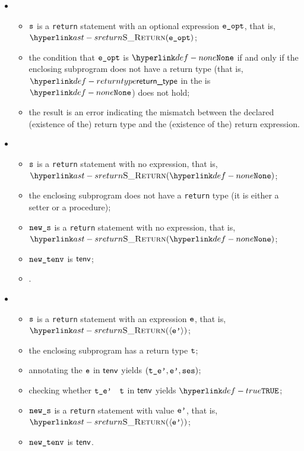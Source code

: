 \ProseParagraph
\OneApplies
\begin{itemize}
  \item {}
  \begin{itemize}
    \item $\vs$ is a \texttt{return} statement with an optional expression $\veopt$, that is, \\
          $\SReturn(\veopt)$;
    \item the condition that $\veopt$ is $\None$ if and only if the enclosing subprogram does not have a return type
          (that is, $\returntype$ in the \localstaticenvironmentterm{} is $\None$) does not hold;
    \item the result is an error indicating the mismatch between the declared (existence of the) return type
          and the (existence of the) return expression.
  \end{itemize}

  \item {}
  \begin{itemize}
    \item $\vs$ is a \texttt{return} statement with no expression, that is, $\SReturn(\None)$;
    \item the enclosing subprogram does not have a \texttt{return} type (it is either a setter
          or a procedure);
    \item $\news$ is a \texttt{return} statement with no expression, that is, $\SReturn(\None)$;
    \item $\newtenv$ is $\tenv$;
    \item {}.
  \end{itemize}

  \item {}
  \begin{itemize}
    \item $\vs$ is a \texttt{return} statement with an expression $\ve$, that is, $\SReturn(\langle \vep \rangle)$;
    \item the enclosing subprogram has a return type $\vt$;
    \item annotating the \rhsexpression{} $\ve$ in $\tenv$ yields $(\tep,\vep,\vses)$\ProseOrTypeError;
    \item checking whether $\vtep$ \typesatisfies\ $\vt$ in $\tenv$ yields $\True$\ProseOrTypeError;
    \item $\news$ is a \texttt{return} statement with value $\vep$, that is, $\SReturn(\langle \vep \rangle)$;
    \item $\newtenv$ is $\tenv$.
  \end{itemize}
\end{itemize}
\FormallyParagraph
\begin{mathpar}
\end{mathpar}

